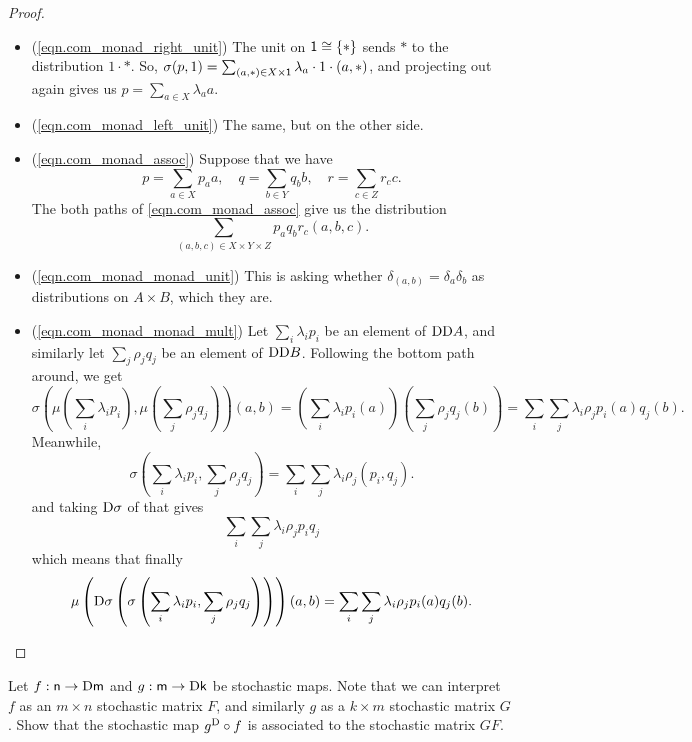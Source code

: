 \documentclass[DynamicalBook]{subfiles}
\begin{document}
\begin{proof}
  \begin{itemize}
\item (\cref{eqn.com_monad_right_unit}) The unit on $\mathsf{1} \cong \{\ast\}$
  sends $\ast$ to the distribution $1 \cdot \ast$. So, $\sigma(p, 1) = \sum_{(a, \ast) \in X \times
    \mathsf{1}} \lambda_a \cdot 1 \cdot (a, \ast)$, and projecting out again gives
  us $p = \sum_{a \in X} \lambda_a a$.
\item (\cref{eqn.com_monad_left_unit}) The same, but on the other side.
\item (\cref{eqn.com_monad_assoc}) Suppose that we have
          \[
    p = \sum_{a \in X} p_a a, \quad
    q = \sum_{b \in Y} q_b b, \quad
    r = \sum_{c \in Z} r_c c.
          \]
  The both paths of \cref{eqn.com_monad_assoc} give us the distribution
  \[
\sum_{(a, b, c) \in X \times Y \times Z} p_a q_b r_c (a, b, c).
  \]
  \item (\cref{eqn.com_monad_monad_unit}) This is asking whether $\delta_{(a,
      b)} = \delta_a \delta_b$ as distributions on $A \times B$, which they are.
  \item (\cref{eqn.com_monad_monad_mult}) Let $\sum_{i} \lambda_i p_i$ be an
    element of $\mathrm{D}\mathrm{D} A$, and similarly let $\sum_j \rho_j q_j$ be an
    element of $\mathrm{D}\mathrm{D} B$. Following the bottom path around, we get
    \[
\sigma\left( \mu\left( \sum_i \lambda_i p_i \right), \mu\left( \sum_j \rho_j q_j
  \right) \right)(a, b) = \left( \sum_i \lambda_i p_i(a) \right)\left( \sum_j
  \rho_j q_j(b) \right) = \sum_i \sum_j \lambda_i \rho_j p_i(a)q_j(b).
    \]
    Meanwhile,
    \[\sigma\left( \sum_i \lambda_i p_i, \sum_j \rho_j q_j \right) =
      \sum_i \sum_j \lambda_i \rho_j (p_i, q_j).
    \]
    and taking $\mathrm{D} \sigma$ of that gives
    \[
\sum_i \sum_j \lambda_i \rho_j p_i q_j
\]
which means that finally
\[
\mu\left(\mathrm{D} \sigma\left( \sigma\left( \sum_i \lambda_i p_i, \sum_j \rho_j
      q_j \right) \right) \right)(a, b) = \sum_i \sum_j \lambda_{i}\rho_j p_i(a)q_j(b).
\]
  \end{itemize}

\end{proof}

\begin{exercise}
  Let $f : \mathsf{n} \to \mathrm{D} \mathsf{m}$ and $g : \mathsf{m} \to \mathrm{D} \mathsf{k}$
  be stochastic maps. Note that we can interpret $f$ as an $m \times n$
  stochastic matrix $F$, and similarly $g$ as a $k \times m$ stochastic matrix $G$. Show
  that the stochastic map $g^{\mathrm{D}} \circ f$ is associated to the stochastic
  matrix $GF$.
\end{exercise}
\end{document}
